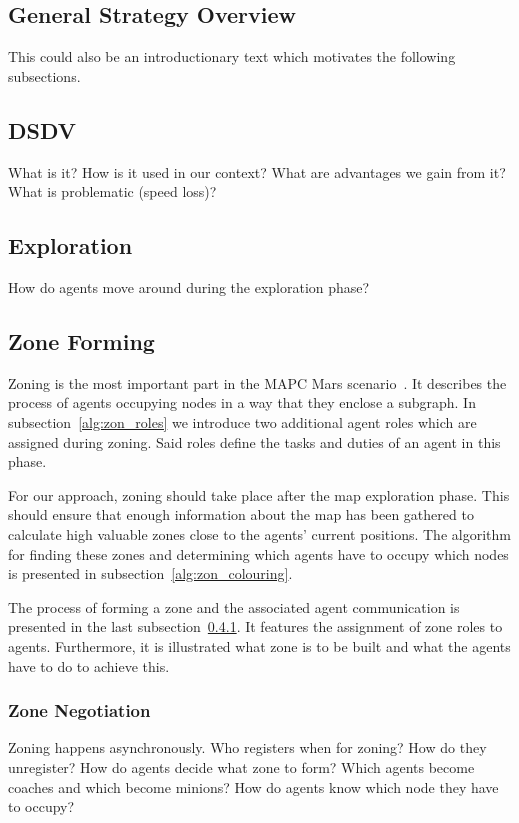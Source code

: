 \subsection{General Strategy Overview}
This could also be an introductionary text which motivates the following subsections.

\subsection{DSDV}
What is it? How is it used in our context? What are advantages we gain from it? What is problematic (speed loss)?

\subsection{Exploration}
How do agents move around during the exploration phase?

\subsection{Zone Forming}
Zoning is the most important part in the MAPC Mars scenario~\cite{ahlbrecht_mapc_2014}.%
It describes the process of agents occupying nodes in a way that they enclose a subgraph. In subsection~\ref{alg:zon_roles} we introduce two additional agent roles which are assigned during zoning. Said roles define the tasks and duties of an agent in this phase.

For our approach, zoning should take place after the map exploration phase. This should ensure that enough information about the map has been gathered to calculate high valuable zones close to the agents' current positions. The algorithm for finding these zones and determining which agents have to occupy which nodes is presented in subsection~\ref{alg:zon_colouring}.

The process of forming a zone and the associated agent communication is presented in the last subsection~\ref{alg:zon_formation}. It features the assignment of zone roles to agents. Furthermore, it is illustrated what zone is to be built and what the agents have to do to achieve this.



\subsubsection{Zone Negotiation}\label{alg:zon_formation}
Zoning happens asynchronously. Who registers when for zoning? How do they unregister?
How do agents decide what zone to form? Which agents become coaches and which become minions? How do agents know which node they have to occupy?

